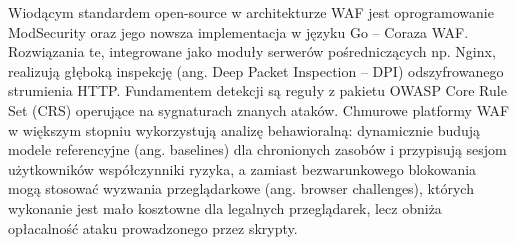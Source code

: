 \documentclass[a4paper,12pt]{article}
\begin{document}
Wiodącym standardem open-source w architekturze WAF jest oprogramowanie ModSecurity oraz jego nowsza implementacja w języku Go -- Coraza WAF. Rozwiązania te, integrowane jako moduły serwerów pośredniczących np. Nginx, realizują głęboką inspekcję (ang. Deep Packet Inspection -- DPI) odszyfrowanego strumienia HTTP. Fundamentem detekcji są reguły z pakietu OWASP Core Rule Set (CRS) operujące na sygnaturach znanych ataków. Chmurowe platformy WAF w większym stopniu wykorzystują analizę behawioralną: dynamicznie budują modele referencyjne (ang. baselines) dla chronionych zasobów i przypisują sesjom użytkowników współczynniki ryzyka, a zamiast bezwarunkowego blokowania mogą stosować wyzwania przeglądarkowe (ang. browser challenges), których wykonanie jest mało kosztowne dla legalnych przeglądarek, lecz obniża opłacalność ataku prowadzonego przez skrypty.
\end{document}
